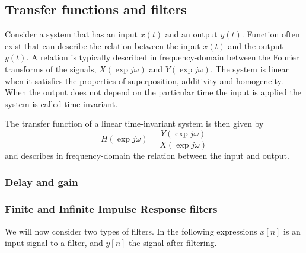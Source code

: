 

\subsection{Transfer functions and filters}
Consider a system that has an input $x(t)$ and an output $y(t)$. Function often
exist that can describe the relation between the input $x(t)$ and the output
$y(t)$. A relation is typically described in frequency-domain between the
Fourier transforms of the signals, $X(\exp{j\omega})$ and $Y(\exp{j\omega})$.
The system is linear when it satisfies the properties of superposition,
additivity and homogeneity. When the output does not depend on the particular
time the input is applied the system is called time-invariant.

The transfer function of a linear time-invariant system is then given by
\begin{equation}
  H(\exp{j\omega}) = \frac{Y(\exp{j\omega})}{X(\exp{j\omega})}
\end{equation}
and describes in frequency-domain the relation between the input and output.

%
%
%




\subsubsection{Delay and gain}



\subsubsection{Finite and Infinite Impulse Response filters}
We will now consider two types of filters. In the following expressions $x[n]$ is an input signal to a filter, and $y[n]$ the signal after filtering.

